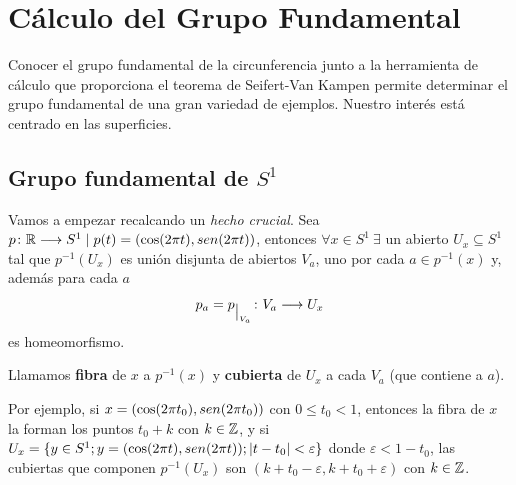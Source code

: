 \documentclass[GTSResumen.tex]{subfiles}
\begin{document}
%
\renewcommand\chaptername{\Huge Tema}

\titleformat{\chapter}[display]
    {\normalfont\huge\bfseries}{\chaptertitlename\ \thechapter}{10pt}{\Huge}
\titlespacing*{\chapter}{0pt}{-1cm}{10pt}
%
%
%


\setcounter{chapter}{3}

\chapter{Cálculo del Grupo Fundamental}

Conocer el grupo fundamental de la circunferencia junto a la herramienta de cálculo que proporciona el teorema de Seifert-Van Kampen permite determinar el grupo fundamental de una gran variedad de ejemplos. Nuestro interés está centrado en las superficies.

\section{Grupo fundamental de $S^1$}

Vamos a empezar recalcando un {\em hecho crucial}. Sea $p\colon{\mathbb{R}}\longrightarrow{S^1}\mid p(t)=(\cos(2\pi t),sen (2\pi t))$, entonces $\forall x\in S^1\ \exists$ un abierto $U_x\subseteq S^1$ tal que $p^{-1}(U_x)$ es unión disjunta de abiertos $V_a$, uno por cada $a\in p^{-1}(x)$ y, además para cada $a$
\[
p_a=p_{\big|_{V_a}}\colon{V_a}\longrightarrow{U_x}
\]
es homeomorfismo.
\begin{defi}
Llamamos \textbf{fibra} de $x$ a $p^{-1}(x)$ y \textbf{cubierta} de $U_x$ a cada $V_a$ (que contiene a $a$).
\end{defi}

Por ejemplo, si $x=(\cos(2\pi t_0),sen (2\pi t_0))$ con $0\leq t_0 < 1$, entonces la fibra de $x$ la forman los puntos $t_0+ k$ con $k\in \mathbb{Z}$, y si  $U_x =\{y\in S^1; y=(\cos(2\pi t),sen (2\pi t)); |t-t_0| < \varepsilon\}$ donde $\varepsilon<1-t_0$, las cubiertas que componen  $p^{-1}(U_x)$ son $(k+t_0-\varepsilon,k+t_0+\varepsilon)$ con $k\in\mathbb{Z}$.
\end{document}
